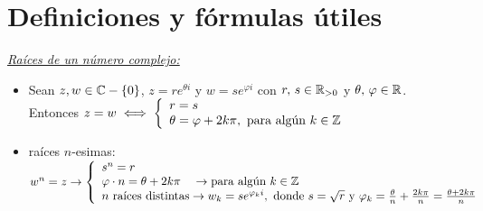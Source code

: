 \section{Definiciones y fórmulas útiles}
\textit{\underline{Raíces de un número complejo: }}
\begin{itemize}
	\item Sean $z, w \en \complejos -\set{0}$, $z = re^{\theta i}$ y $w = se^{\varphi i }$ con $r,\, s \en \reales_{>0}$
	      y $\theta,\, \varphi \en \reales$.\\ Entonces $z = w \sisolosi
		      \llave{l}{
			      r = s\\
			      \theta = \varphi + 2 k\pi,\ \text{para algún } k \en \enteros
		      }$
	\item raíces $n$-esimas: $w^n = z
		      \to
		      \llave{l}{
		      s^n = r \\
		      \varphi \cdot n = \theta + 2 k \pi \quad\to \text{para algún $k\en \enteros$}\\
		      \text{$n$ raíces distintas} \to w_k=se^{\varphi_k i}, \text{ donde } s = \sqrt{r} \text{ y }
		      \varphi_k = \frac{\theta}{n} + \frac{2k\pi}{n} = \frac{\theta + 2k\pi}{n}
		      }$
\end{itemize}
